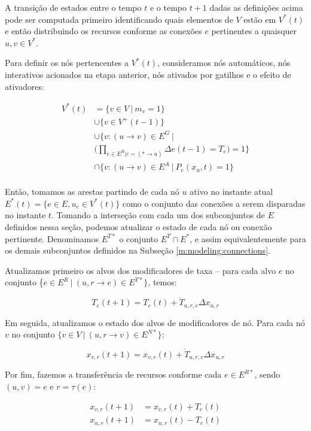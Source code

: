 \documentclass[10pt,a4paper]{article}
\begin{document}
A transição de estados entre o tempo $t$ e o tempo $t+1$ dadas as definições acima pode ser computada primeiro identificando quais elementos de $V$ estão em $V^*(t)$ e então distribuindo os recursos conforme as conexões $e$ pertinentes a quaisquer $u,v \in V^*$.

Para definir os nós pertencentes a $V^*(t)$, consideramos nós automáticos, nós interativos acionados na etapa anterior, nós ativados por gatilhos e o efeito de ativadores:

\begin{align*}
    V^*(t) &= \{v \in V \ | \ m_v = 1\}\\& \cup \{v \in V^+(t-1)\}\\
    & \cup \{v: (u \rightarrow v) \in E^G\ | \\\
    &\Big(\prod_{e \in E^R | e = (* \rightarrow u)}{\Delta e(t-1) = T_e \Big)} = 1 \}\\
    &\cap \{v: (u \rightarrow v) \in E^A\ | \ P_e(x_u, t) = 1 \}\\
\end{align*}

Então, tomamos as arestas partindo de cada nó $u$ ativo no instante atual $E^*(t) = \{e \in E, u_e \in V^*(t)\}$ como o conjunto das conexões a serem disparadas no instante $t$. Tomando a interseção com cada um dos subconjuntos de $E$ definidos nessa seção, podemos atualizar o estado de cada nó ou conexão pertinente. Denominamos $E^{T*}$ o conjunto $E^T \cap E^*$, e assim equivalentemente para os demais subconjuntos definidos na Subseção \ref{m:modeling:connections}.

Atualizamos primeiro os alvos dos modificadores de taxa -- para cada alvo $e$ no conjunto \{$e \in E^R \ | \ (u, r \rightarrow e) \in E^{T*}\}$, temos:

$$
T_{e}(t+1) = T_{e}(t) + \dot{T}_{u,r,e} \Delta x_{u,r}
$$

Em seguida, atualizamos o estado dos alvos de modificadores de nó. Para cada nó $v$ no conjunto $\{v \in V \ | \ (u, r \rightarrow v) \in E^{N*}\}$:

$$
x_{v, r}(t+1) = x_{v, r}(t) + \dot{T}_{u,r,v} \Delta x_{u,r}
$$

Por fim, fazemos a transferência de recursos conforme cada $e \in E^{R*}$, sendo $(u, v) = e$ e $r = \tau(e)$:

\begin{align*}
    x_{v, r}(t+1) &= x_{v,r}(t) + T_e(t)\\
    x_{u, r}(t+1) &= x_{u,r}(t) - T_e(t)\\
\end{align*}
\end{document}

